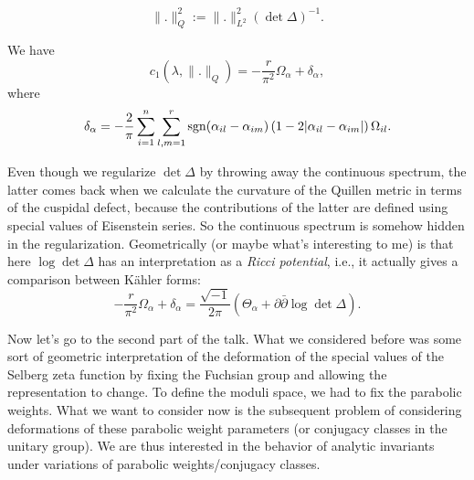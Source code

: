 \documentclass[reqno]{amsart} 
\numberwithin{theorem}{section}
\numberwithin{equation}{section}
\begin{document}
\begin{equation*}
  \lVert . \rVert_Q^2 := \lVert . \rVert_{L^2}^2 \left( \det \Delta \right)^{-1} .
\end{equation*}
\begin{theorem}
  We have
  \begin{equation*}
    c_1 \left( \lambda, \lVert . \rVert_Q \right) = - \frac{r}{ \pi^2} \Omega_\alpha + \delta_\alpha,
  \end{equation*}
  where
  \begin{equation*}
    \delta_\alpha = - \frac{2}{\pi} \sum_{i = 1}^n \sum_{l, m = 1}^r \operatorname{sgn}(\alpha_{i l} - \alpha_{i m}) \left( 1 - 2 \lvert \alpha_{i l} - \alpha_{i m} \rvert \right) \Omega_{i l}.
  \end{equation*}
\end{theorem}
Even though we regularize $\det \Delta$ by throwing away the continuous spectrum, the latter comes back when we calculate the curvature of the Quillen metric in terms of the cuspidal defect, because the contributions of the latter are defined using special values of Eisenstein series.  So the continuous spectrum is somehow hidden in the regularization.  Geometrically (or maybe what's interesting to me) is that here $\log \det \Delta$ has an interpretation as a \emph{Ricci potential}, i.e., it actually gives a comparison between K\"{a}hler forms:
\begin{equation*}
  - \frac{r}{\pi^2} \Omega_\alpha + \delta_\alpha = \frac{\sqrt{- 1}}{2 \pi} \left( \Theta_\alpha + \partial \bar{\partial} \log \det \Delta \right).
\end{equation*}

Now let's go to the second part of the talk.  What we considered before was some sort of geometric interpretation of the deformation of the special values of the Selberg zeta function by fixing the Fuchsian group and allowing the representation to change.  To define the moduli space, we had to fix the parabolic weights.  What we want to consider now is the subsequent problem of considering deformations of these parabolic weight parameters (or conjugacy classes in the unitary group).  We are thus interested in the behavior of analytic invariants under variations of parabolic weights/conjugacy classes.
\end{document}
